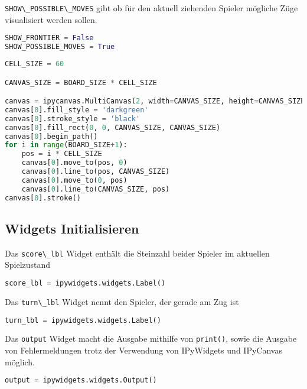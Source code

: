 \passthrough{\lstinline!SHOW\_POSSIBLE\_MOVES!} gibt ob für den aktuell
ziehenden Spieler mögliche Züge visualisiert werden sollen.

\begin{lstlisting}[language=Python]
SHOW_FRONTIER = False
SHOW_POSSIBLE_MOVES = True
\end{lstlisting}

\begin{lstlisting}[language=Python]
CELL_SIZE = 60

CANVAS_SIZE = BOARD_SIZE * CELL_SIZE

canvas = ipycanvas.MultiCanvas(2, width=CANVAS_SIZE, height=CANVAS_SIZE)
canvas[0].fill_style = 'darkgreen'
canvas[0].stroke_style = 'black'
canvas[0].fill_rect(0, 0, CANVAS_SIZE, CANVAS_SIZE)
canvas[0].begin_path()
for i in range(BOARD_SIZE+1):
    pos = i * CELL_SIZE
    canvas[0].move_to(pos, 0)
    canvas[0].line_to(pos, CANVAS_SIZE)
    canvas[0].move_to(0, pos)
    canvas[0].line_to(CANVAS_SIZE, pos)
canvas[0].stroke()
\end{lstlisting}

\hypertarget{widgets-initialisieren}{%
\subsection{Widgets Initialisieren}\label{widgets-initialisieren}}

Das \passthrough{\lstinline!score\_lbl!} Widget enthält die Steinzahl
beider Spieler im aktuellen Spielzustand

\begin{lstlisting}[language=Python]
score_lbl = ipywidgets.widgets.Label()
\end{lstlisting}

Das \passthrough{\lstinline!turn\_lbl!} Widget nennt den Spieler, der
gerade am Zug ist

\begin{lstlisting}[language=Python]
turn_lbl = ipywidgets.widgets.Label()
\end{lstlisting}

Das \passthrough{\lstinline!output!} Widget macht die Ausgabe mithilfe
von \passthrough{\lstinline!print()!}, sowie die Ausgabe von
Fehlermeldungen trotz der Verwendung von IPyWidgets und IPyCanvas
möglich.

\begin{lstlisting}[language=Python]
output = ipywidgets.widgets.Output()
\end{lstlisting}

